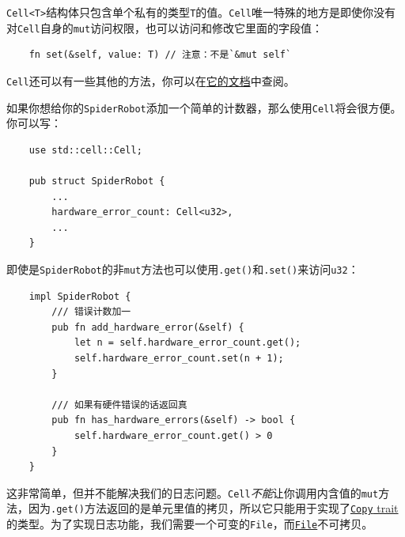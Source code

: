 \texttt{Cell<T>}结构体只包含单个私有的类型\texttt{T}的值。\texttt{Cell}唯一特殊的地方是即使你没有对\texttt{Cell}自身的\texttt{mut}访问权限，也可以访问和修改它里面的字段值：



\begin{verbatim}
    fn set(&self, value: T) // 注意：不是`&mut self`
\end{verbatim}

\texttt{Cell}还可以有一些其他的方法，你可以在\href{https://doc.rust-lang.org/std/cell/struct.Cell.html}{它的文档}中查阅。

如果你想给你的\texttt{SpiderRobot}添加一个简单的计数器，那么使用\texttt{Cell}将会很方便。你可以写：
\begin{verbatim}
    use std::cell::Cell;

    pub struct SpiderRobot {
        ...
        hardware_error_count: Cell<u32>,
        ...
    }
\end{verbatim}

即使是\texttt{SpiderRobot}的非\texttt{mut}方法也可以使用\texttt{.get()}和\texttt{.set()}来访问\texttt{u32}：
\begin{verbatim}
    impl SpiderRobot {
        /// 错误计数加一
        pub fn add_hardware_error(&self) {
            let n = self.hardware_error_count.get();
            self.hardware_error_count.set(n + 1);
        }

        /// 如果有硬件错误的话返回真
        pub fn has_hardware_errors(&self) -> bool {
            self.hardware_error_count.get() > 0
        }
    }
\end{verbatim}

这非常简单，但并不能解决我们的日志问题。\texttt{Cell}\emph{不能}让你调用内含值的\texttt{mut}方法，因为\texttt{.get()}方法返回的是单元里值的拷贝，所以它只能用于实现了\hyperref[copy]{\texttt{Copy} trait}的类型。为了实现日志功能，我们需要一个可变的\texttt{File}，而\hyperref[file]{\texttt{File}}不可拷贝。


